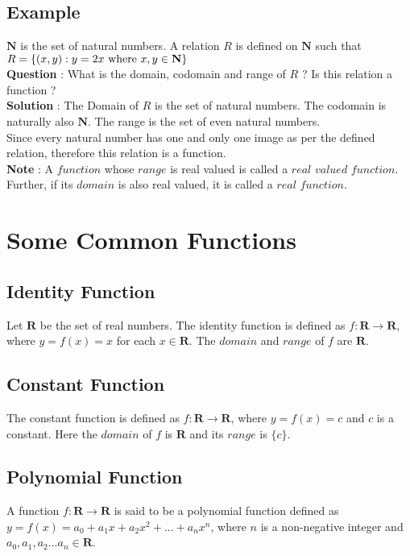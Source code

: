 \documentclass[12pt, letterpaper]{article}
\begin{document}
\subsection{Example}
$\mathbf{N}$ is the set of natural numbers. A relation $R$ is defined on $\mathbf{N}$ such that $R = \{(x,y) : y=2x \textnormal{ where } x,y \in \mathbf{N}\}$\\
\textbf{Question} : What is the domain, codomain and range of $R$ ? Is this relation a function ?\\
\textbf{Solution} : The Domain of $R$ is the set of natural numbers. The codomain is naturally also $\mathbf{N}$. The range is the set of even natural numbers.\\
Since every natural number has one and only one image as per the defined relation, therefore this relation is a function.\\
\textbf{Note} : A $function$ whose $range$ is real valued is called a $real$ $valued$ $function$. Further, if its $domain$ is also real valued, it is called a $real$ $function$.

\section{Some Common Functions}

\subsection{Identity Function}
Let $\mathbf{R}$ be the set of real numbers. The identity function is defined as $f : \mathbf{R} \rightarrow \mathbf{R}$, where $y = f(x) = x$ for each $x \in \mathbf{R}$. The $domain$ and $range$ of $f$ are $\mathbf{R}$.

\subsection{Constant Function}
The constant function is defined as $f : \mathbf{R} \rightarrow \mathbf{R}$, where $y = f(x) = c$ and $c$ is a constant. Here the $domain$ of $f$ is $\mathbf{R}$ and its $range$ is $\{c\}$.

\subsection{Polynomial Function}
A function $f : \mathbf{R} \rightarrow \mathbf{R}$ is said to be a polynomial function defined as $y = f(x) = a_0 + a_1x + a_2x^2 + ... + a_nx^n$, where $n$ is a non-negative integer and $a_0, a_1, a_2...a_n \in \mathbf{R}$.                
\end{document}
